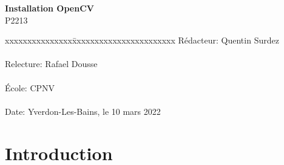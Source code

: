 \documentclass[
	a4paper,									%
	11pt,										%
	twoside,									%
	openright,									%
	notitlepage,									%
	parskip=half,								%
]{scrreprt}										%
\begin{document}
\begin{titlepage}
	\vspace{3cm}

	\fontsize{30pt}{32pt}\selectfont 
	\noindent \textbf{Installation OpenCV} \\

	\fontsize{18pt}{20pt}\selectfont\vspace{0.3em} P2213 \\

	\vspace{4cm}
	\fontsize{12pt}{15pt}\selectfont
	\begin{tabbing}
		xxxxxxxxxxxxxxx\=xxxxxxxxxxxxxxxxxxxxxxx \kill
		Rédacteur:\> Quentin Surdez\\ \\
		Relecture:\> Rafael Dousse\\ \\
		École:\> CPNV\\ \\
		Date:\> Yverdon-Les-Bains, le 10 mars 2022\\%
	\end{tabbing}
\end{titlepage}

\tableofcontents

\cleardoublepage

\setcounter{page}{1}

\chapter{Introduction}
\end{document}
